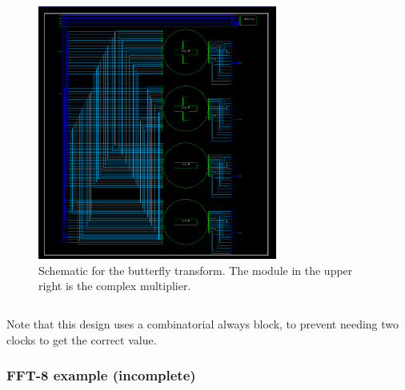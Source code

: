 \documentclass[12pt]{article}
\begin{document}
\begin{figure}[H]
	\centering
	\includegraphics[width=0.7\textwidth]{butterfly_schematic.png}
	\caption{Schematic for the butterfly transform. The module in the upper right is the complex multiplier.}
	\label{fig:butterfly_schem}
\end{figure}

	\inputminted[frame=lines]{verilog}{../rtl/butterfly.v}
Note that this design uses a combinatorial always block, to prevent needing two
clocks to get the correct value.
\pagebreak
\subsubsection{FFT-8 example (incomplete)}
\end{document}
